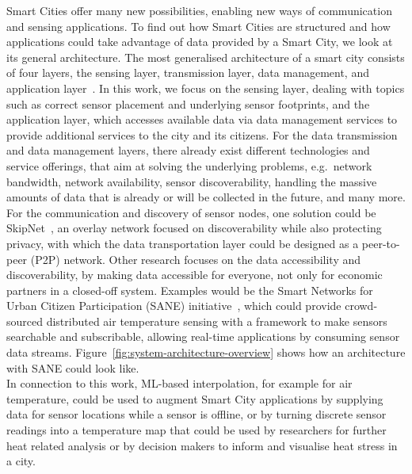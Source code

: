 Smart Cities offer many new possibilities, enabling new ways of communication and sensing applications. To find out how Smart Cities are structured and how applications could take advantage of data provided by a Smart City, we look at its general architecture.
The most generalised architecture of a smart city consists of four layers, the sensing layer, transmission layer, data management, and application layer~\cite{silva2018towards}. In this work, we focus on the sensing layer, dealing with topics such as correct sensor placement and underlying sensor footprints, and the application layer, which accesses available data via data management services to provide additional services to the city and its citizens. For the data transmission and data management layers, there already exist different technologies and service offerings, that aim at solving the underlying problems, e.g.\ network bandwidth, network availability, sensor discoverability, handling the massive amounts of data that is already or will be collected in the future, and many more. For the communication and discovery of sensor nodes, one solution could be SkipNet~\cite{harvey2002skipnet}, an overlay network focused on discoverability while also protecting privacy, with which the data transportation layer could be designed as a peer-to-peer (P2P) network. Other research focuses on the data accessibility and discoverability, by making data accessible for everyone, not only for economic partners in a closed-off system. Examples would be the Smart Networks for Urban Citizen Participation (SANE) initiative~\cite{bornholdt2019sane}, which could provide crowd-sourced distributed air temperature sensing with a framework to make sensors searchable and subscribable, allowing real-time applications by consuming sensor data streams. Figure~\ref{fig:system-architecture-overview} shows how an architecture with SANE could look like.\\
In connection to this work, ML-based interpolation, for example for air temperature, could be used to augment Smart City applications by supplying data for sensor locations while a sensor is offline, or by turning discrete sensor readings into a temperature map that could be used by researchers for further heat related analysis or by decision makers to inform and visualise heat stress in a city.\\

